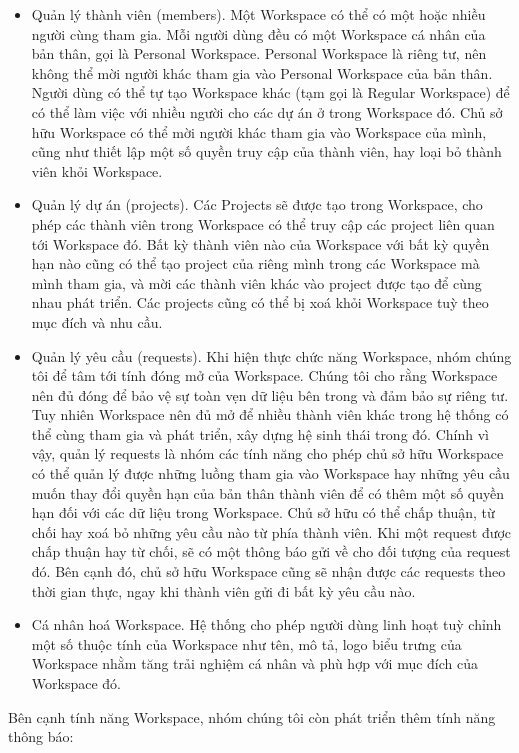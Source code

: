 \begin{itemize}
    \item Quản lý thành viên (members). Một Workspace có thể có một hoặc nhiều người cùng tham gia. Mỗi người dùng đều có một Workspace cá nhân của bản thân, gọi là Personal Workspace. Personal Workspace là riêng tư, nên không thể mời người khác tham gia vào Personal Workspace của bản thân. Người dùng có thể tự tạo Workspace khác (tạm gọi là Regular Workspace) để có thể làm việc với nhiều người cho các dự án ở trong Workspace đó. Chủ sở hữu Workspace có thể mời người khác tham gia vào Workspace của mình, cũng như thiết lập một số quyền truy cập của thành viên, hay loại bỏ thành viên khỏi Workspace.
    \item Quản lý dự án (projects). Các Projects sẽ được tạo trong Workspace, cho phép các thành viên trong Workspace có thể truy cập các project liên quan tới Workspace đó. Bất kỳ thành viên nào của Workspace với bất kỳ quyền hạn nào cũng có thể tạo project của riêng mình trong các Workspace mà mình tham gia, và mời các thành viên khác vào project được tạo để cùng nhau phát triển. Các projects cũng có thể bị xoá khỏi Workspace tuỳ theo mục đích và nhu cầu.
    \item Quản lý yêu cầu (requests). Khi hiện thực chức năng Workspace, nhóm chúng tôi để tâm tới tính đóng mở của Workspace. Chúng tôi cho rằng Workspace nên đủ đóng để bảo vệ sự toàn vẹn dữ liệu bên trong và đảm bảo sự riêng tư. Tuy nhiên Workspace nên đủ mở để nhiều thành viên khác trong hệ thống có thể cùng tham gia và phát triển, xây dựng hệ sinh thái trong đó. Chính vì vậy, quản lý requests là nhóm các tính năng cho phép chủ sở hữu Workspace có thể quản lý được những luồng tham gia vào Workspace hay những yêu cầu muốn thay đổi quyền hạn của bản thân thành viên để có thêm một số quyền hạn đối với các dữ liệu trong Workspace. Chủ sở hữu có thể chấp thuận, từ chối hay xoá bỏ những yêu cầu nào từ phía thành viên. Khi một request được chấp thuận hay từ chối, sẽ có một thông báo gửi về cho đối tượng của request đó. Bên cạnh đó, chủ sở hữu Workspace cũng sẽ nhận được các requests theo thời gian thực, ngay khi thành viên gửi đi bất kỳ yêu cầu nào.
    \item Cá nhân hoá Workspace. Hệ thống cho phép người dùng linh hoạt tuỳ chỉnh một số thuộc tính của Workspace như tên, mô tả, logo biểu trưng của Workspace nhằm tăng trải nghiệm cá nhân và phù hợp với mục đích của Workspace đó.
\end{itemize}
Bên cạnh tính năng Workspace, nhóm chúng tôi còn phát triển thêm tính năng thông báo:
